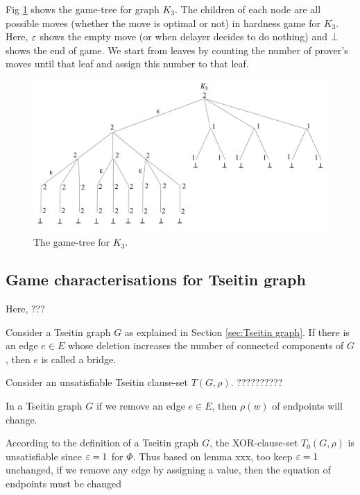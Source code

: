 \documentclass{report}
\begin{document}
\begin{examp}\label{exp:gg1}
Fig \ref{fig:gg1} shows the game-tree for graph $K_3$. The children of each node are all possible moves (whether the move is optimal or not) in hardness game for $K_3$. Here, $\varepsilon $ shows the empty move (or when delayer decides to do nothing) and $\bot$ shows the end of game. We start from leaves by counting the number of prover's moves until that leaf and assign this number to that leaf. 
   \begin{figure}
   \begin{center}
   \includegraphics[scale =0.45]{gg1.png}
   \caption{The game-tree for $K_3$.}
   \label{fig:gg1}
   \end{center}
   \end{figure}
\end{examp}
\subsection{Game characterisations for Tseitin graph}
\label{sec:hd-game-graph}

Here, ???

\begin{defi}\label{def:bridge}
Consider a Tseitin graph $G$ as explained in Section \ref{sec:Tseitin graph}. If there is an edge $e \in E$ whose deletion increases the number of connected components of $G$, then $e$ is called a bridge.
\end{defi} 

Consider an unsatisfiable Tseitin clause-set $T(G,\rho)$. ??????????

\begin{lem}\label{lem:game3}
In a Tseitin graph $G$ if we remove an edge $e \in E$, then $\rho(w)$ of endpoints will change. 
\end{lem}
\begin{prf}
According to the definition of a Tseitin graph $G$, the XOR-clause-set $T_0(G,\rho)$ is unsatisfiable since $\varepsilon=1$ for $\Phi$. Thus based on lemma xxx, too keep $\varepsilon=1$ unchanged, if we remove any edge by assigning a value, then the equation of endpoints must be changed
\end{prf}
\end{document}
